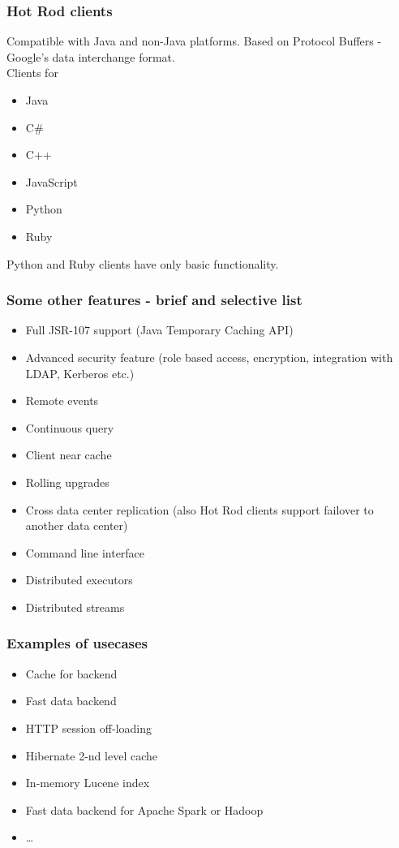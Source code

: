 \documentclass[10pt,utf8]{beamer}
\begin{document}
\begin{frame}
  \frametitle{Hot Rod clients}
	Compatible with Java and non-Java platforms. Based on Protocol Buffers - Google's data interchange format.\\
	\vspace{0.5cm}
	Clients for
	\begin{itemize}
		\item Java
		\item C\#
		\item C++
		\item JavaScript
		\item Python
		\item Ruby
	\end{itemize}
	Python and Ruby clients have only basic functionality.
\end{frame}

\begin{frame}
  \frametitle{Some other features - brief and selective list}
  \begin{itemize}
		\item Full JSR-107 support (Java Temporary Caching API)
		\pause
		\item Advanced security feature (role based access, encryption, integration with LDAP, Kerberos etc.)
		\pause
		\item Remote events
		\pause
		\item Continuous query
		\pause
		\item Client near cache
		\pause
		\item Rolling upgrades
		\pause
		\item Cross data center replication (also Hot Rod clients support failover to another data center)
		\pause
		\item Command line interface
		\pause
		\item Distributed executors
		\pause
		\item Distributed streams
  \end{itemize}
\end{frame}

\begin{frame}
	\frametitle{Examples of usecases}
	\begin{itemize}
		\item Cache for backend 
		\item Fast data backend
		\item HTTP session off-loading
		\item Hibernate 2-nd level cache
		\item In-memory Lucene index
		\item Fast data backend for Apache Spark or Hadoop
		\item \dots
	\end{itemize}
\end{frame}
\end{document}
